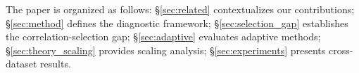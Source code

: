 The paper is organized as follows: \S\ref{sec:related} contextualizes our contributions; \S\ref{sec:method} defines the diagnostic framework; \S\ref{sec:selection_gap} establishes the correlation-selection gap; \S\ref{sec:adaptive} evaluates adaptive methods; \S\ref{sec:theory_scaling} provides scaling analysis; \S\ref{sec:experiments} presents cross-dataset results.
